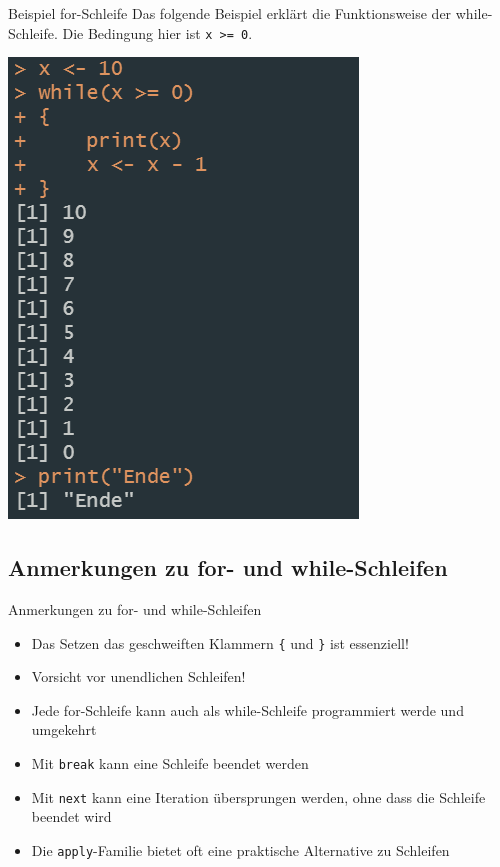 \documentclass[aspectratio = 169]{chariteBeamer}
\begin{document}
\begin{frame}[fragile]{Beispiel for-Schleife}
  Das folgende Beispiel erklärt die Funktionsweise der while-Schleife. Die Bedingung hier ist \verb+x >= 0+.\bigskip\\
  \begin{centering}
  \includegraphics[]{while1.png}
  \end{centering}
\end{frame}

\subsection*{Anmerkungen zu for- und while-Schleifen}

\begin{frame}[fragile]{Anmerkungen zu for- und while-Schleifen}
  \begin{itemize}
    \item Das Setzen das geschweiften Klammern \verb+{+ und \verb+}+ ist essenziell!
    \item Vorsicht vor unendlichen Schleifen!
    \item Jede for-Schleife kann auch als while-Schleife programmiert werde und umgekehrt
    \item Mit \verb+break+ kann eine Schleife beendet werden
    \item Mit \verb+next+ kann eine Iteration übersprungen werden, ohne dass die Schleife beendet wird
    \item Die \verb+apply+-Familie bietet oft eine praktische Alternative zu Schleifen
    \end{itemize}
\end{frame}
\end{document}
